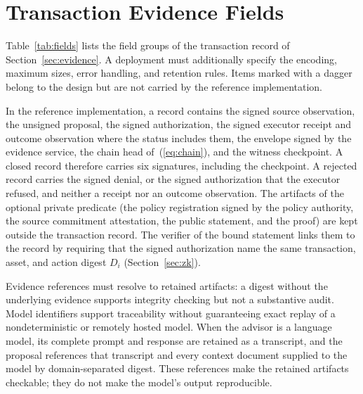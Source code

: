 \section{Transaction Evidence Fields}
\label{s:fields}
Table~\ref{tab:fields} lists the field groups of the transaction record of Section~\ref{sec:evidence}. A deployment must additionally specify the encoding, maximum sizes, error handling, and retention rules. Items marked with a dagger belong to the design but are not carried by the reference implementation.

In the reference implementation, a record contains the signed source observation, the unsigned proposal, the signed authorization, the signed executor receipt and outcome observation where the status includes them, the envelope signed by the evidence service, the chain head of~(\ref{eq:chain}), and the witness checkpoint. A closed record therefore carries six signatures, including the checkpoint. A rejected record carries the signed denial, or the signed authorization that the executor refused, and neither a receipt nor an outcome observation. The artifacts of the optional private predicate (the policy registration signed by the policy authority, the source commitment attestation, the public statement, and the proof) are kept outside the transaction record. The verifier of the bound statement links them to the record by requiring that the signed authorization name the same transaction, asset, and action digest $D_i$ (Section~\ref{sec:zk}).

Evidence references must resolve to retained artifacts: a digest without the underlying evidence supports integrity checking but not a substantive audit. Model identifiers support traceability without guaranteeing exact replay of a nondeterministic or remotely hosted model. When the advisor is a language model, its complete prompt and response are retained as a transcript, and the proposal references that transcript and every context document supplied to the model by domain-separated digest. These references make the retained artifacts checkable; they do not make the model's output reproducible.

